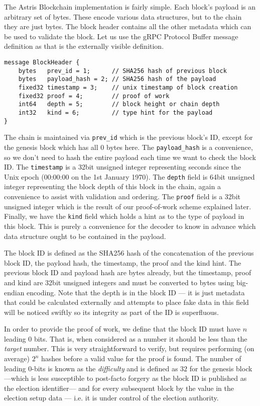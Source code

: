 The Astris Blockchain implementation is fairly simple. Each block's payload is an arbitrary set of bytes. These encode various data structures, but to the chain they are just bytes. The block header contains all the other metadata which can be used to validate the block. Let us use the gRPC Protocol Buffer message definition as that is the externally visible definition.

\begin{lstlisting}[language=protobuf3, style=protobuf]
message BlockHeader {
    bytes   prev_id = 1;      // SHA256 hash of previous block
    bytes   payload_hash = 2; // SHA256 hash of the payload
    fixed32 timestamp = 3;    // unix timestamp of block creation
    fixed32 proof = 4;        // proof of work
    int64   depth = 5;        // block height or chain depth
    int32   kind = 6;         // type hint for the payload
}
\end{lstlisting}


The chain is maintained via \texttt{prev\_id} which is the previous block's ID, except for the genesis block which has all $0$ bytes here. The \texttt{payload\_hash} is a convenience, so we don't need to hash the entire payload each time we want to check the block ID. The \texttt{timestamp} is a 32bit unsigned integer representing seconds since the Unix epoch (00:00:00 on the 1st January 1970). The \texttt{depth} field is 64bit unsigned integer representing the block depth of this block in the chain, again a convenience to assist with validation and ordering. The \texttt{proof} field is a 32bit unsigned integer which is the result of our proof-of-work scheme explained later. Finally, we have the \texttt{kind} field which holds a hint as to the type of payload in this block. This is purely a convenience for the decoder to know in advance which data structure ought to be contained in the payload.

The block ID is defined as the SHA256 hash of the concatenation of the previous block ID, the payload hash, the timestamp, the proof and the kind hint. The previous block ID and payload hash are bytes already, but the timestamp, proof and kind are 32bit unsigned integers and must be converted to bytes using big-endian encoding. Note that the depth is in the block ID --- it is just metadata that could be calculated externally and attempts to place fake data in this field will be noticed swiftly so its integrity as part of the ID is superfluous.

In order to provide the proof of work, we define that the block ID must have $n$ leading 0 bits. That is, when considered as a number it should be less than the \emph{target} number. This is very straightforward to verify, but requires performing (on average) $2^n$ hashes before a valid value for the proof is found. The number of leading 0-bits is known as the \emph{difficulty} and is defined as $32$ for the genesis block ---which is less susceptible to post-facto forgery as the block ID is published as the election identifier--- and for every subsequent block by the value in the election setup data --- i.e. it is under control of the election authority.

